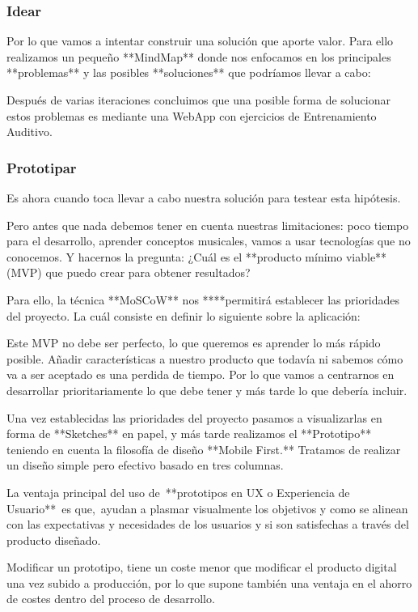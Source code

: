 \documentclass[12pt,twoside,titlepage]{report}
\begin{document}
\subsubsection{Idear}

Por lo que vamos a intentar construir una solución que aporte valor. Para ello realizamos un pequeño **MindMap** donde nos enfocamos en los principales **problemas** y las posibles **soluciones** que podríamos llevar a cabo:

Después de varias iteraciones concluimos que una posible forma de solucionar estos problemas es mediante una WebApp con ejercicios de Entrenamiento Auditivo. 

\subsubsection{Prototipar}

Es ahora cuando toca llevar a cabo nuestra solución para testear esta hipótesis. 

Pero antes que nada debemos tener en cuenta nuestras limitaciones: poco tiempo para el desarrollo, aprender conceptos musicales, vamos a usar tecnologías que no conocemos. Y hacernos la pregunta: ¿Cuál es el **producto mínimo viable** (MVP) que puedo crear para obtener resultados?

Para ello, la técnica **MoSCoW** nos ****permitirá establecer las prioridades del proyecto. La cuál consiste en definir lo siguiente sobre la aplicación:

Este MVP no debe ser perfecto, lo que queremos es aprender lo más rápido posible. Añadir características a nuestro producto que todavía ni sabemos cómo va a ser aceptado es una perdida de tiempo. Por lo que vamos a centrarnos en desarrollar prioritariamente lo que debe tener y más tarde lo que debería incluir.

Una vez establecidas las prioridades del proyecto pasamos a visualizarlas en forma de **Sketches** en papel, y más tarde realizamos el **Prototipo** teniendo en cuenta la filosofía de diseño **Mobile First.** Tratamos de realizar un diseño simple pero efectivo basado en tres columnas.

La ventaja principal del uso de **prototipos en UX o Experiencia de Usuario** es que, ayudan a plasmar visualmente los objetivos y como se alinean con las expectativas y necesidades de los usuarios y si son satisfechas a través del producto diseñado.

Modificar un prototipo, tiene un coste menor que modificar el producto digital una vez subido a producción, por lo que supone también una ventaja en el ahorro de costes dentro del proceso de desarrollo.
\end{document}
